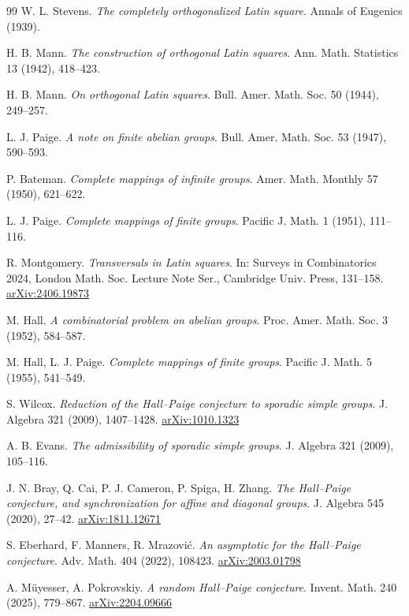 \begin{thebibliography}{99}
 W. L. Stevens. \emph{The completely orthogonalized Latin square}. Annals of Eugenics (1939).

 H. B. Mann. \emph{The construction of orthogonal Latin squares}. Ann. Math. Statistics 13 (1942), 418--423.

 H. B. Mann. \emph{On orthogonal Latin squares}. Bull. Amer. Math. Soc. 50 (1944), 249--257.

 L. J. Paige. \emph{A note on finite abelian groups}. Bull. Amer. Math. Soc. 53 (1947), 590--593.

 P. Bateman. \emph{Complete mappings of infinite groups}. Amer. Math. Monthly 57 (1950), 621--622.

 L. J. Paige. \emph{Complete mappings of finite groups}. Pacific J. Math. 1 (1951), 111--116.

 R. Montgomery. \emph{Transversals in Latin squares}. In: Surveys in Combinatorics 2024, London Math. Soc. Lecture Note Ser., Cambridge Univ. Press, 131--158. \href{https://arxiv.org/abs/2406.19873}{arXiv:2406.19873}

 M. Hall. \emph{A combinatorial problem on abelian groups}. Proc. Amer. Math. Soc. 3 (1952), 584--587.

 M. Hall, L. J. Paige. \emph{Complete mappings of finite groups}. Pacific J. Math. 5 (1955), 541--549.

 S. Wilcox. \emph{Reduction of the Hall--Paige conjecture to sporadic simple groups}. J. Algebra 321 (2009), 1407--1428. \href{https://arxiv.org/abs/1010.1323}{arXiv:1010.1323}

 A. B. Evans. \emph{The admissibility of sporadic simple groups}. J. Algebra 321 (2009), 105--116.

 J. N. Bray, Q. Cai, P. J. Cameron, P. Spiga, H. Zhang. \emph{The Hall--Paige conjecture, and synchronization for affine and diagonal groups}. J. Algebra 545 (2020), 27--42. \href{https://arxiv.org/abs/1811.12671}{arXiv:1811.12671}

 S. Eberhard, F. Manners, R. Mrazovi\'c. \emph{An asymptotic for the Hall--Paige conjecture}. Adv. Math. 404 (2022), 108423. \href{https://arxiv.org/abs/2003.01798}{arXiv:2003.01798}

 A. M\"uyesser, A. Pokrovskiy. \emph{A random Hall--Paige conjecture}. Invent. Math. 240 (2025), 779--867. \href{https://arxiv.org/abs/2204.09666}{arXiv:2204.09666}


\end{thebibliography}
